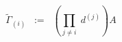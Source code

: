 \begin{equation}
{\tilde{\Gamma}}_{(i)} \;\; := \;\; \left( \prod_{j \neq i} \; d^{(j)}
\right) A
\label{eq:2.2}
\end{equation}

